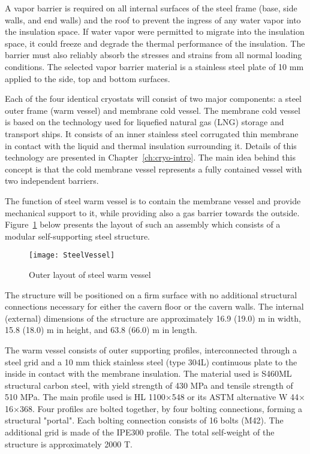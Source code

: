 A vapor barrier is required on all internal surfaces of the 
steel frame (base, side walls, and end walls) and the roof to 
prevent the ingress of any water vapor into the insulation 
space. If water vapor were permitted to migrate into the 
insulation space, it could freeze and degrade the thermal 
performance of the insulation. The barrier must also 
reliably absorb the stresses and strains from all normal 
loading conditions. The selected vapor barrier material 
is a stainless steel plate of 10 mm applied to the side,
top and bottom surfaces. 

Each of the four identical cryostats will consist of two 
major components: a steel outer frame (warm vessel) and 
membrane cold vessel. The membrane cold vessel is based 
on the technology used for liquefied natural gas (LNG) 
storage and transport ships. It consists of an inner 
stainless steel corrugated thin membrane in contact with 
the liquid and thermal insulation surrounding it. Details 
of this technology are presented in Chapter~\ref{ch:cryo-intro}. 
The main idea behind this concept is that the cold membrane vessel 
represents a fully contained vessel with two independent 
barriers.

The function of steel warm vessel is to contain the membrane 
vessel and provide mechanical support to it, while providing 
also a gas barrier towards the outside. Figure~\ref{fig:SteelVessel} 
below presents the layout of such an assembly which consists
of a modular self-supporting steel structure.

\begin{figure}[htbp]
\centering
\texttt{[image: SteelVessel]}
\caption[Outer layout of steel warm vessel]{Outer layout of steel warm vessel}
\label{fig:SteelVessel}
\end{figure}

The structure will be positioned on a firm surface with 
no additional structural connections necessary for either 
the cavern floor or the cavern walls. The internal (external) 
dimensions of the structure are approximately 16.9 (19.0) m 
in width, 15.8 (18.0) m in height, and 63.8 (66.0) m in length.

The warm vessel consists of outer supporting profiles, interconnected 
through a steel grid and a 10 mm thick stainless steel (type 304L) 
continuous plate to the inside in contact with the membrane insulation.
The material used is S460ML structural carbon steel, with yield 
strength of 430 MPa and tensile strength of 510 MPa. The main 
profile used is HL 1100$\times$548 or its ASTM alternative 
W 44$\times$16$\times$368. Four profiles are bolted together, by 
four bolting connections, forming a structural "portal". Each 
bolting connection consists of 16 bolts (M42). The additional 
grid is made of the IPE300 profile. The total self-weight of 
the structure is approximately 2000 T.

